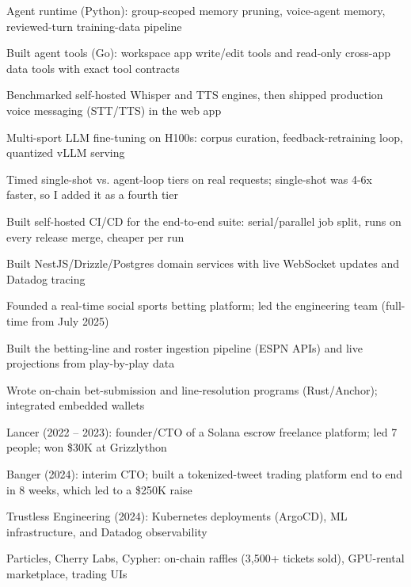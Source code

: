 \documentclass[print]{jack-resume}
\begin{document}
\begin{tightemize}
    \item Agent runtime (Python): group-scoped memory pruning, voice-agent memory, reviewed-turn training-data pipeline
    \item Built agent tools (Go): workspace app write/edit tools and read-only cross-app data tools with exact tool contracts
    \item Benchmarked self-hosted Whisper and TTS engines, then shipped production voice messaging (STT/TTS) in the web app
    \item Multi-sport LLM fine-tuning on H100s: corpus curation, feedback-retraining loop, quantized vLLM serving
    \item Timed single-shot vs. agent-loop tiers on real requests; single-shot was 4-6x faster, so I added it as a fourth tier
    \item Built self-hosted CI/CD for the end-to-end suite: serial/parallel job split, runs on every release merge, cheaper per run
\end{tightemize}
\sectionsep

\begin{tightemize}
    \item Built NestJS/Drizzle/Postgres domain services with live WebSocket updates and Datadog tracing
    \item Founded a real-time social sports betting platform; led the engineering team (full-time from July 2025)
    \item Built the betting-line and roster ingestion pipeline (ESPN APIs) and live projections from play-by-play data
    \item Wrote on-chain bet-submission and line-resolution programs (Rust/Anchor); integrated embedded wallets
\end{tightemize}
\sectionsep

\begin{tightemize}
    \item Lancer (2022 – 2023): founder/CTO of a Solana escrow freelance platform; led 7 people; won \$30K at Grizzlython
    \item Banger (2024): interim CTO; built a tokenized-tweet trading platform end to end in 8 weeks, which led to a \$250K raise
    \item Trustless Engineering (2024): Kubernetes deployments (ArgoCD), ML infrastructure, and Datadog observability
    \item Particles, Cherry Labs, Cypher: on-chain raffles (3,500+ tickets sold), GPU-rental marketplace, trading UIs
\end{tightemize}
\sectionsep
\end{document}

